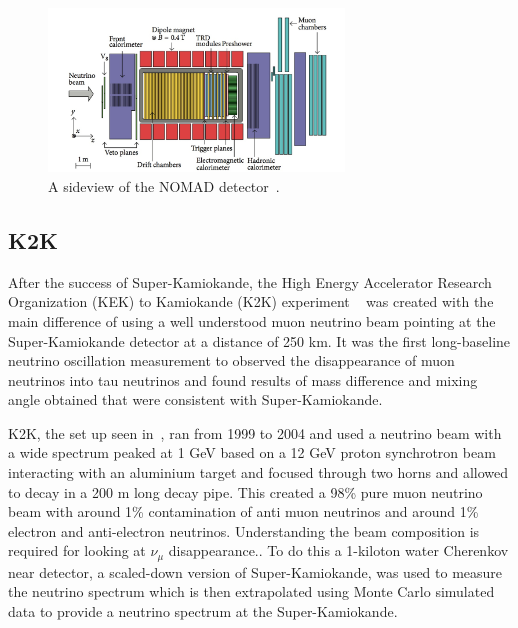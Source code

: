 \begin{figure}[h!]
\centering
  \centering
\includegraphics[width=0.7\textwidth]{figures/NOMAD2.jpeg}
\vspace{2mm}
\caption{A sideview of the NOMAD detector~\cite{69NOMAD}.}
\label{fig:NOMAD}
\end{figure}

\subsection{K2K}
After the success of Super-Kamiokande, the High Energy Accelerator Research Organization (KEK) to Kamiokande (K2K) experiment ~\cite{22K2K} was created with the main difference of using a well understood muon neutrino beam pointing at the Super-Kamiokande detector at a distance of 250 km. It was the first long-baseline neutrino oscillation measurement to observed the disappearance of muon neutrinos into tau neutrinos and found results of mass difference and mixing angle obtained that were consistent with Super-Kamiokande.

K2K, the set up seen in~, ran from 1999 to 2004 and used a neutrino beam with a wide spectrum peaked at 1 GeV based on a 12 GeV proton synchrotron beam interacting with an aluminium target and focused through two horns and allowed to decay in a 200 m long decay pipe. This created a 98\% pure muon neutrino beam with around 1\% contamination of anti muon neutrinos and around 1\% electron and anti-electron neutrinos. Understanding the beam composition is required for looking at $\nu_\mu$ disappearance.. To do this a 1-kiloton water Cherenkov near detector,  a scaled-down version of Super-Kamiokande, was used to measure the neutrino spectrum which is then extrapolated using Monte Carlo simulated data to provide a neutrino spectrum at the Super-Kamiokande.

